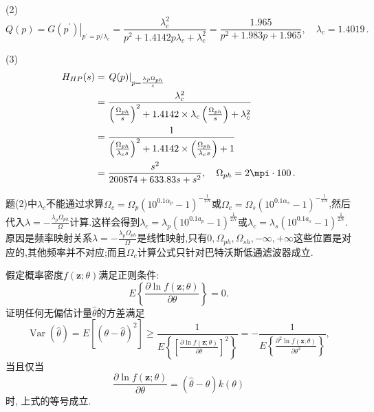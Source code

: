 \documentclass[list,answers,csize4,custom]{sysuexam}
\begin{document}
\begin{groups}
\begin{questions}[rst]
\begin{solution}[5cm]
        \sj (2) $$
        Q(p)=\left.G\left(p^{\prime}\right)\right|_{p^{\prime}=p / \lambda_{c}}=\frac{\lambda_{c}^{2}}{p^{2}+1.4142 p \lambda_{c}+\lambda_{c}^{2}}=\frac{1.965}{p^{2}+1.983 p+1.965},\quad \lambda_{c}=1.4019\,.
        $$

        \sj (3)
        $$
        \begin{aligned}
        H_{H P}(s) &=\left.Q(p)\right|_{p=\frac{\lambda_{p} \Omega_{p h}}{s}}\\
        &=\frac{\lambda_{c}^{2}}{\left(\frac{\Omega_{p h}}{s}\right)^{2}+1.4142 \times \lambda_{c}\left(\frac{\Omega_{p h}}{s}\right)+\lambda_{c}^{2}}\\
        &=\frac{1}{\left(\frac{\Omega_{p h}}{\lambda_{c} s}\right)^{2}+1.4142 \times\left(\frac{\Omega_{p h}}{\lambda_{c} s}\right)+1} \\
        &=\frac{s^{2}}{200874+633.83 s+s^{2}}, \quad \Omega_{p h}=2 \mpi \cdot 100\,.
        \end{aligned}
        $$

        \remark 题(2)中$\lambda_c$不能通过求算$\Omega_c=\Omega_p(10^{0.1\alpha_p}-1)^{-\frac{1}{2N}}$或$\Omega_c=\Omega_s(10^{0.1\alpha_s}-1)^{-\frac{1}{2N}}$,然后代入$\lambda=-\frac{\lambda_{p}\Omega_{ph}}{\Omega}$计算.这样会得到$\lambda_{c}=\lambda_{p}\left(10^{0.1 a_{p}}-1\right)^{\frac{1}{2 N}}$或$\lambda_{c}=\lambda_{s}\left(10^{0.1 a_{s}}-1\right)^{\frac{1}{2 N}}$.原因是频率映射关系$\lambda=-\frac{\lambda_{p}\Omega_{ph}}{\Omega}$是线性映射,只有$0,\Omega_{ph},\Omega_{sh},-\infty,+\infty$这些位置是对应的,其他频率并不对应;而且$\Omega_c$计算公式只针对巴特沃斯低通滤波器成立.
    \end{solution}

    \question[10] 假定概率密度$f(\boldsymbol{z} ; \theta)$满足正则条件:
    $$E\left\{\frac{\partial \ln f(\boldsymbol{z} ; \theta)}{\partial \theta}\right\}=0.$$
    证明任何无偏估计量$\hat{\theta}$的方差满足
    $$\operatorname{Var}(\hat{\theta})=E\left[(\theta-\hat{\theta})^{2}\right] \geqslant \frac{1}{E\left\{\left[\frac{\partial \ln f(\boldsymbol{z} ; \theta)}{\partial \theta}\right]^{2}\right\}}=-\frac{1}{E\left\{\frac{\partial^{2} \ln f(\boldsymbol{z} ; \theta)}{\partial \theta^{2}}\right\}},$$
    当且仅当$$\frac{\partial \ln f(\boldsymbol{z} ; \theta)}{\partial \theta}=(\hat{\theta}-\theta) k(\theta)$$时,%
    上式的等号成立.
    

\end{questions}
\end{groups}
\end{document}
